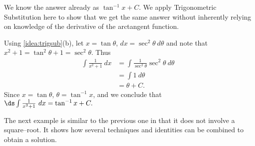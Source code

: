 {We know the answer already as $\tan^{-1}x+C$. We apply Trig\-o\-no\-metric Substitution here to show that we get the same answer without inherently relying on knowledge of the derivative of the arctangent function.

Using \autoref{idea:trigsub}(b), let $x=\tan\theta$, $dx=\sec^2\theta\ d\theta$ and note that $x^2+1 = \tan^2\theta+1 = \sec^2\theta$. Thus
\begin{align*}
\int \frac1{x^2+1}\ dx &= \int \frac{1}{\sec^2\theta}\sec^2\theta\ d\theta \\
			&= \int 1\ d\theta\\
			&= \theta + C.
\end{align*}
Since $x=\tan \theta$, $\theta = \tan^{-1}x$, and we conclude that $\ds \int\frac1{x^2+1}\ dx = \tan^{-1}x+C.$}

The next example is similar to the previous one in that it does not involve a square--root. It shows how several techniques and identities can be combined to obtain a solution.

